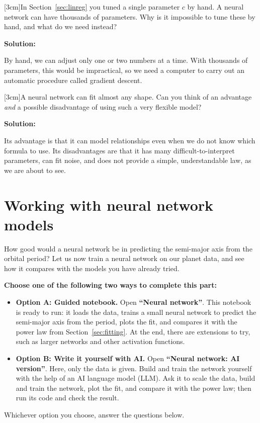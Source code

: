 \documentclass[12pt]{article}
\makeatletter
\newcounter{question}
\newlength\questionheight
\newcommand{\question}{\@ifstar{\question@text}{\question@field}}
\newcommand{\question@heading}[1]{%
  \refstepcounter{question}%
  \vspace{0.3cm}%
  \noindent\textbf{\faEdit\ Question \thequestion: #1}%
}
\newcommand{\question@text}[1]{%
  \question@heading{#1}%
}
\newcommand{\question@field}[2][\questionheight]{%
  \question@heading{#2}%
 \\[0.3em] \begin{Form}
    \TextField[
      name=Q\thequestion,
      multiline=true,
      width=\linewidth,
      height=#1,
      charsize=10pt,
      bordercolor={0 0 0},
      borderwidth=1.8,
      backgroundcolor={1 1 1}
    ]{}
  \end{Form}
  \vspace{0.3cm}%
}
\newenvironment{solution}{%
  \begin{solutionbox}\textbf{Solution:}
}{%
  \end{solutionbox}
}
\makeatother
\begin{document}
\question[3cm]{In Section~\ref{sec:linreg} you tuned a single parameter $c$ by hand. A neural network can have thousands of parameters. Why is it impossible to tune these by hand, and what do we need instead?}

\begin{solution}
By hand, we can adjust only one or two numbers at a time. With thousands of parameters, this would be impractical, so we need a computer to carry out an automatic procedure called gradient descent.
\end{solution}

\question[3cm]{A neural network can fit almost any shape. Can you think of an advantage \emph{and} a possible disadvantage of using such a very flexible model?}

\begin{solution}
Its advantage is that it can model relationships even when we do not know which formula to use. Its disadvantages are that it has many difficult-to-interpret parameters, can fit noise, and does not provide a simple, understandable law, as we are about to see.
\end{solution}

\section{Working with neural network models}\label{sec:nnwork}

How  good would a neural network be in predicting the semi-major axis from the orbital period? Let us now train a neural network on our planet data, and see how it compares with the models you have already tried.

\begin{importantbox}
\textbf{Choose one of the following two ways to complete this part:}
\begin{itemize}
  \item \textbf{Option A: Guided notebook.} Open \textbf{``Neural network''}. This notebook is ready to run: it loads the data, trains a small neural network to predict the semi-major axis from the period, plots the fit, and compares it with the power law from Section~\ref{sec:fitting}. At the end, there are extensions to try, such as larger networks and other activation functions.
  \item \textbf{Option B: Write it yourself with AI.} Open \textbf{``Neural network: AI version''}. Here, only the data is given. Build and train the network yourself with the help of an AI language model (LLM). Ask it to scale the data, build and train the network, plot the fit, and compare it with the power law; then run its code and check the result.
\end{itemize}
Whichever option you choose, answer the questions below.
\end{importantbox}
\end{document}
